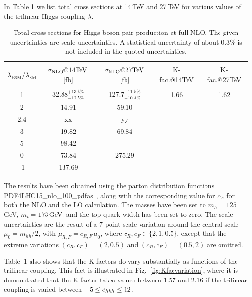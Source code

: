 In Table \ref{tab:sigmatot} we list total cross sections at 14\,TeV and 27\,TeV for various values of the trilinear Higgs coupling $\lambda$. 
\begin{table}[htb]
\begin{center}
\begin{tabular}{| c | c | c |c|c|}
\hline
&&&&\\
$\lambda_{\mathrm{BSM}}/\lambda_{\mathrm{SM}}$ & $\sigma_{\rm{NLO}}@14 \mathrm{TeV}$\,[fb] & $\sigma_{\rm{NLO}}@27 \mathrm{TeV}$\,[fb] &K-fac.@14TeV&K-fac.@27TeV\\
&&&&\\
\hline
1& 32.88$^{+13.5\%}_{-12.5\%}$&127.7$^{+11.5\%}_{-10.4\%}$ &1.66&1.62\\
\hline
2 & 14.91 &  59.10&&\\
\hline
2.4 & xx& yy&&\\
\hline
3& 19.82 & 69.84&&\\
\hline 
5 & 98.42& &&\\
\hline 
0 & 73.84& 275.29&&\\
\hline 
-1 & 137.69& &&\\
\hline
\end{tabular}
\end{center}
\caption{Total cross sections for Higgs boson pair production at full NLO. The given uncertainties are scale uncertainties. 
A statistical uncertainty of about 0.3\% is not included in the quoted uncertainties.\label{tab:sigmatot}}
\end{table}
The results have been obtained using the parton distribution functions PDF4LHC15\_nlo\_100\_pdfas~\cite{Butterworth:2015oua,CT14,MMHT14,NNPDF},
along with the corresponding value for $\alpha_s$ for both the NLO and
the LO calculation.
The masses have been set to $m_h=125$\,GeV, $m_t=173$\,GeV,
and the top quark width has been set to zero. 
The scale uncertainties are the result of a 7-point scale variation around the central scale $\mu_0 = m_{hh}/2$,
with $\mu_{R,F}=c_{R,F}\,\mu_0$, where 
$c_R,c_F\in \{2,1,0.5\}$, except that the extreme variations $(c_R,c_F)=(2,0.5)$ and $(c_R,c_F)=(0.5,2)$
are omitted. 

Table~\ref{tab:sigmatot} also shows that the K-factors do vary substantially as functions of the trilinear coupling.
This fact is illustrated in Fig.~\ref{fig:Kfacvariation}, where it is demonstrated that the K-factor takes values between 1.57 and 2.16
if the trilinear coupling is varied between $-5\leq c_{hhh}\leq 12$.


